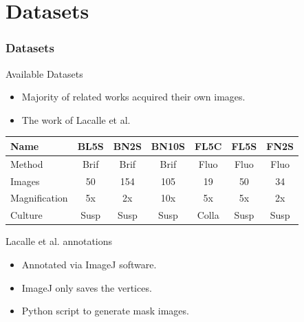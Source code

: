 \section{Datasets}


\begin{frame}{}
    \frametitle{Datasets}
\end{frame}


\begin{frame}{Available Datasets}

    \begin{itemize}
        \item Majority of related works acquired their own images.
        \item The work of Lacalle et al.
    \end{itemize}

    \begin{table}[]
        \centering
        \setlength{\tabcolsep}{10pt}
        
        {
            \begin{tabular}{lcccccc}
                \textbf{Name} & \textbf{BL5S} & \textbf{BN2S} & \textbf{BN10S} & \textbf{FL5C} & \textbf{FL5S} & \textbf{FN2S} \\
                \midrule
                Method & Brif & Brif & Brif & Fluo & Fluo & Fluo \\
                Images & 50 & 154 & 105 & 19 & 50 & 34 \\
                Magnification & 5x & 2x & 10x & 5x & 5x & 2x \\
                Culture & Susp & Susp & Susp & Colla & Susp & Susp
            \end{tabular}
        }
    \end{table}
\end{frame}

\begin{frame}{Lacalle et al. annotations}
    \begin{itemize}
        \item Annotated via ImageJ software.
        \item ImageJ only saves the vertices.
        \item Python script to generate mask images.
    \end{itemize}
\end{frame}

